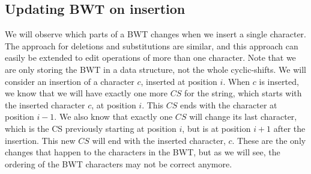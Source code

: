 \subsection*{Updating BWT on insertion}

We will observe which parts of a BWT changes when we insert a single character. The
approach for deletions and substitutions are similar, and this approach can easily be
extended to edit operations of more than one character. Note that we are only storing the
BWT in a data structure, not the whole cyclic-shifts. We will consider an insertion of a
character $c$, inserted at position $i$. When $c$ is inserted, we know that we will have
exactly one more $CS$ for the string, which starts with the inserted character $c$, at
position $i$. This $CS$ ends with the character at position $i - 1$. We also know that
exactly one $CS$ will change its last character, which is the CS previously starting at
position $i$, but is at position $i + 1$ after the insertion. This new $CS$ will end with
the inserted character, $c$. These are the only changes that happen to the characters in
the BWT, but as we will see, the ordering of the BWT characters may not be correct
anymore.

\begin{table}[t]
	\begin{center}
        \hspace{1cm}
		\caption{BWT for string before and after insert}
		\label{table:bwtupdate}
	\end{center}
\end{table}


